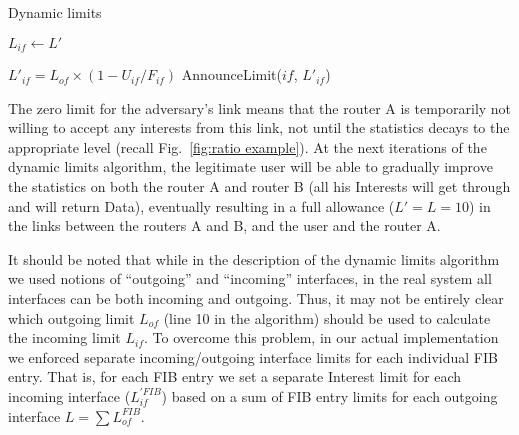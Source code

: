 { 
\begin{algorithm}[h]
\footnotesize
\caption{\small Dynamic limits}
\label{alg:dynamic limits}
\begin{algorithmic}[1]
\State{} 
\vspace{0.2cm}
  

\vspace{0.2cm}

\State{} 
    \State $L_{if} \leftarrow L'$
\EndFunction

\vspace{0.2cm}

 

        \State $L'_{if}= {L_{of}} \times (1 - U_{if}/F_{if})$
        \State AnnounceLimit($if$, $L'_{if}$)
   \EndFor

\EndFor
\EndFunction

\end{algorithmic}
\end{algorithm}


The zero limit for the adversary's link means that the router A is temporarily not willing to accept any interests from this link, not until the statistics decays to the appropriate level (recall Fig.~\ref{fig:ratio example}).
At the next iterations of the dynamic limits algorithm, the legitimate user will be able to gradually improve the statistics on both the router A and router B (all his Interests will get through and will return Data), eventually resulting in a full allowance ($L'=L=10$) in the links between the routers A and B, and the user and the router A.

It should be noted that while in the description of the dynamic limits algorithm we used notions of ``outgoing'' and ``incoming'' interfaces, in the real system all interfaces can be both incoming and outgoing.
Thus, it may not be entirely clear which outgoing limit $L_{of}$ (line 10 in the algorithm) should be used to calculate the incoming limit $L_{if}$.
To overcome this problem, in our actual implementation we enforced separate incoming/outgoing interface limits for each individual FIB entry.
That is, for each FIB entry we set a separate Interest limit for each incoming interface ($L_{if}^{'FIB}$) based on a sum of FIB entry limits for each outgoing interface $L=\sum{L_{of}^{FIB}}$.


}
